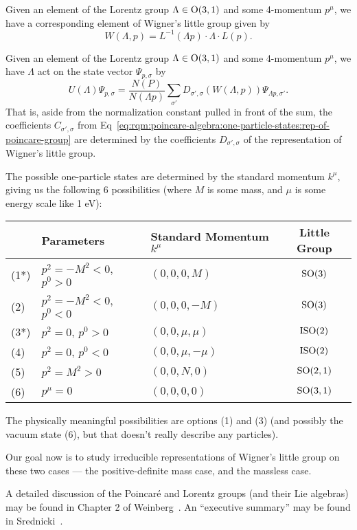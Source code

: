 \begin{corollary}
Given an element of the Lorentz group $\Lambda\in\mathrm{O}(3,1)$ and some
4-momentum $p^{\mu}$, we have a corresponding element of Wigner's little
group given by
\begin{equation}
W(\Lambda,p) = L^{-1}(\Lambda p)\cdot\Lambda\cdot L(p).
\end{equation}
\end{corollary}

\begin{corollary}
Given an element of the Lorentz group $\Lambda\in\mathrm{O}(3,1)$ and some
4-momentum $p^{\mu}$, we have $\Lambda$ act on the state vector
$\Psi_{p,\sigma}$ by
\begin{equation}
U(\Lambda)\Psi_{p,\sigma} = \frac{N(P)}{N(\Lambda p)}\sum_{\sigma'}D_{\sigma',\sigma}(W(\Lambda, p))\Psi_{\Lambda p,\sigma'}.
\end{equation}
That is, aside from the normalization constant pulled in front of the
sum, the coefficients $C_{\sigma',\sigma}$ from Eq~\eqref{eq:rqm:poincare-algebra:one-particle-states:rep-of-poincare-group} are determined by the
coefficients $D_{\sigma',\sigma}$ of the representation of Wigner's
little group.
\end{corollary}

The possible one-particle states are determined by the standard momentum
$k^{\mu}$, giving us the following 6 possibilities (where $M$ is some
mass, and $\mu$ is some energy scale like 1 eV):
\begin{center}
\begin{tabular}{ll|l|c}
    & Parameters & Standard Momentum $k^{\mu}$ & Little Group\\\hline
(1*) & $p^{2}=-M^{2}<0$, $p^{0}>0$ & $(0,0,0,M)$ & $\operatorname{SO}(3)$\\
(2) & $p^{2}=-M^{2}<0$, $p^{0}<0$ & $(0,0,0,-M)$ & $\operatorname{SO}(3)$\\
(3*) & $p^{2}=0$, $p^{0}>0$ & $(0,0,\mu,\mu)$ & $\mathrm{ISO}(2)$\\
(4) & $p^{2}=0$, $p^{0}<0$ & $(0,0,\mu,-\mu)$ & $\mathrm{ISO}(2)$\\
(5) & $p^{2}=M^{2}>0$ & $(0,0,N,0)$ & $\operatorname{SO}(2,1)$\\
(6) & $p^{\mu}=0$ & $(0,0,0,0)$ & $\operatorname{SO}(3,1)$
\end{tabular}
\end{center}
The physically meaningful possibilities are options (1) and (3) (and
possibly the vacuum state (6), but that doesn't really describe any particles).

Our goal now is to study irreducible representations of Wigner's little
group on these two cases --- the positive-definite mass case, and the
massless case.

A detailed discussion of the Poincar\'e and Lorentz groups (and their
Lie algebras) may be found in Chapter 2 of
Weinberg~\cite{Weinberg:1995mt}.
An ``executive summary'' may be found in Srednicki~\cite{Srednicki:2007qs}.

